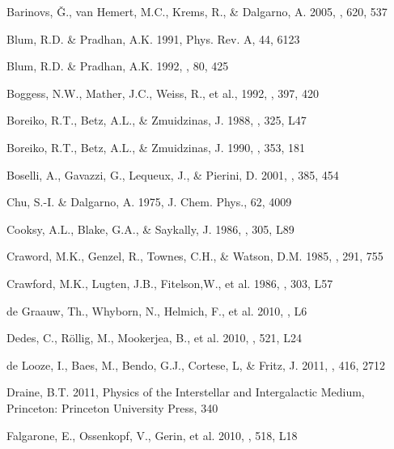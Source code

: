 \documentclass[12pt]{aastex}
\begin{document}
\begin{thebibliography}{}

Barinovs, \v{G}., van Hemert, M.C., Krems, R., \& Dalgarno, A. 2005, \apj, 620, 537

Blum, R.D. \& Pradhan, A.K. 1991, Phys. Rev. A, 44, 6123

Blum, R.D. \& Pradhan, A.K. 1992, \apjs, 80, 425

Boggess, N.W., Mather, J.C., Weiss, R., et al., 1992, \apj, 397, 420

Boreiko, R.T., Betz, A.L., \& Zmuidzinas, J. 1988, \apj, 325, L47

Boreiko, R.T., Betz, A.L., \& Zmuidzinas, J. 1990, \apj, 353, 181

Boselli, A., Gavazzi, G., Lequeux, J., \& Pierini, D. 2001, \aap, 385, 454

Chu, S.-I. \& Dalgarno, A. 1975, J. Chem. Phys., 62, 4009

Cooksy, A.L., Blake, G.A., \& Saykally, J. 1986, \apj, 305, L89

Craword, M.K., Genzel, R., Townes, C.H., \& Watson, D.M. 1985, \apj, 291, 755

Crawford, M.K., Lugten, J.B., Fitelson,W., et al. 1986, \apj, 303, L57

de Graauw, Th., Whyborn, N.,  Helmich, F., et al. 2010, ,  L6

Dedes, C., R\"{o}llig, M., Mookerjea, B., et al. 2010, \aap, 521, L24

de Looze, I., Baes, M., Bendo, G.J., Cortese, L, \& Fritz, J. 2011, \mnras, 416, 2712

Draine, B.T. 2011, Physics of the Interstellar and Intergalactic Medium, Princeton:  Princeton University Press, 340

Falgarone, E., Ossenkopf, V., Gerin, et al. 2010, \aap, 518, L18


\end{thebibliography}
\end{document}
